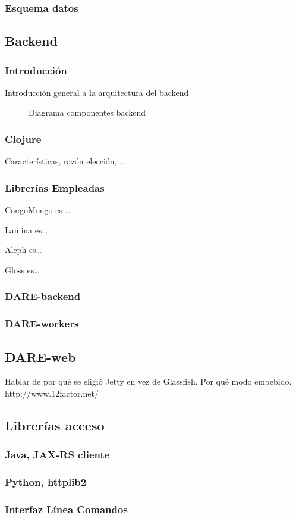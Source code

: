 \subsubsection{Esquema datos}

\subsection{Backend}
\subsubsection{Introducción}
Introducción general a la arquitectura del backend
\begin{figure}[!hbp]
\makebox[\textwidth]{\framebox[5cm]{\rule{0pt}{5cm}}}
\caption{Diagrama componentes backend}
\end{figure}
\subsubsection{Clojure}
Características, razón elección, \ldots{}
\subsubsection{Librerías Empleadas}
\begin{description}
\item{CongoMongo} es \ldots{}
\item{Lamina} es\ldots{}
\item{Aleph} es\ldots{}
\item{Gloss} es\ldots{}
\end{description}
\subsubsection{DARE-backend}
\subsubsection{DARE-workers}

\subsection{DARE-web}
Hablar de por qué se eligió Jetty en vez de Glassfish. Por qué modo
embebido. http://www.12factor.net/

\subsection{Librerías acceso}
\subsubsection{Java, JAX-RS cliente}
\subsubsection{Python, httplib2}
\subsubsection{Interfaz Línea Comandos}
